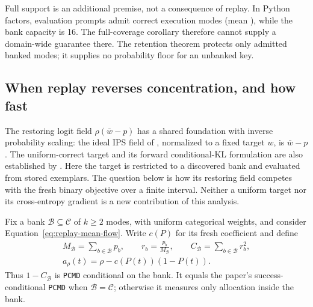 \documentclass{article}
\newcommand{\1}{\mathbf 1}
\newcommand{\pmd}{\texttt{PCMD}}
\theoremstyle{remark}
\theoremstyle{definition}
\theoremstyle{plain}
\begin{document}
Full support is an additional premise, not a consequence of replay. In
Python factors, evaluation prompts admit \MDvmPythonRange{} correct execution
modes (mean \MDvmPythonMean{}), while the bank capacity is 16. The
full-coverage corollary therefore cannot supply a domain-wide guarantee there. The retention theorem protects only
admitted banked modes; it supplies no probability floor for an unbanked key.

\subsection{When replay reverses concentration, and how fast}
\label{app:theory-replay-finite-horizon}

The restoring logit field $\rho(\bar w-p)$ has a shared foundation with
inverse probability scaling: the ideal IPS field of
\citet[Theorem~4.1]{sinha2026expected}, normalized to a fixed target $w$, is
$\bar w-p$. The uniform-correct target and its forward conditional-KL
formulation are also established by \citet{lochab2026ucpo}. Here the target is
restricted to a discovered bank and evaluated from stored exemplars. The
question below is how its restoring field competes with the fresh binary
objective over a finite interval. Neither a uniform target nor its
cross-entropy gradient is a new contribution of this analysis.

Fix a bank $\mathcal B\subseteq\mathcal C$ of $k\ge2$ modes, with uniform
categorical weights, and consider Equation~\eqref{eq:replay-mean-flow}.
Write $c(P)$ for its fresh coefficient and define
\begin{equation}
 \begin{gathered}
 M_{\mathcal B}=\sum_{b\in\mathcal B}p_b,\qquad
 r_b=\frac{p_b}{M_{\mathcal B}},\qquad
 C_{\mathcal B}=\sum_{b\in\mathcal B}r_b^2,\\
 a_\rho(t)=\rho-c(P(t))(1-P(t)).
 \end{gathered}
 \label{eq:replay-finite-notation}
\end{equation}
Thus $1-C_{\mathcal B}$ is \pmd{} conditional on the bank. It equals the
paper's success-conditional \pmd{} when $\mathcal B=\mathcal C$; otherwise
it measures only allocation inside the bank.
\end{document}
